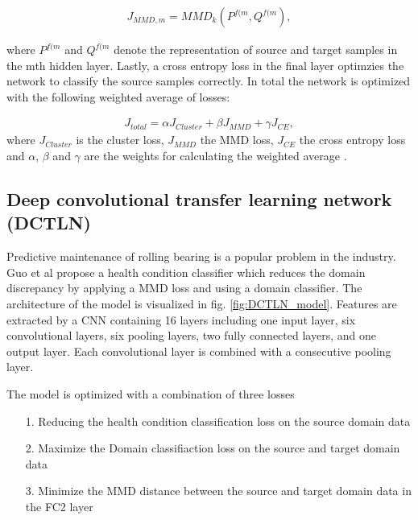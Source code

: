 \begin{equation}
    \begin{aligned}
    J_{MMD,m} = MMD_{k}(P^{f(m}, Q^{f(m}),
    \end{aligned}
\end{equation}

where $P^{f(m}$ and $Q^{f(m}$ denote the representation of source and target samples in the mth hidden layer. Lastly, a cross entropy loss in the final layer optimzies the network to classify the source samples correctly. In total the network is optimized with the following weighted average of losses: 

\begin{equation}
    \begin{aligned}
    J_{total} = \alpha J_{Cluster} + \beta J_{MMD} + \gamma J_{CE}, 
    \end{aligned}
\end{equation}
where $J_{Cluster}$ is the cluster loss, $J_{MMD}$ the MMD loss,  $J_{CE}$ the cross entropy loss and $\alpha$, $\beta$ and $\gamma$ are the weights for calculating the weighted average \cite{Li2018}.


\subsection{Deep convolutional transfer learning network (DCTLN)}
Predictive maintenance of rolling bearing is a popular problem in the industry. Guo et al \cite{Guo2019} propose a health condition classifier which reduces the domain discrepancy by applying a MMD loss and using a domain classifier. The architecture of the model is visualized in fig. \ref{fig:DCTLN_model}. Features are extracted by a CNN containing 16 layers including one input layer, six convolutional layers, six pooling layers, two fully connected layers, and one output layer. Each convolutional layer is combined with a consecutive pooling layer.


The model is optimized with a combination of three losses
\begin{itemize}
    \item [1.] Reducing the health condition classification loss on the source domain data
    \item [2.] Maximize the Domain classifiaction loss on the source and target domain data 
    \item [3.] Minimize the MMD distance between the source and target domain data in the FC2 layer
\end{itemize}

